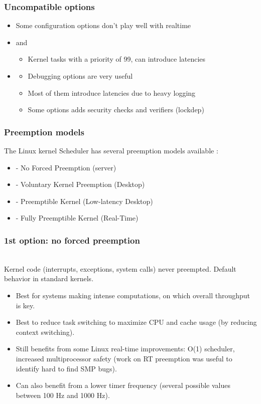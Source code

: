 \begin{frame}
  \frametitle{Uncompatible options}
	\begin{itemize}
		\item Some configuration options don't play well with realtime
		\item {} and 
			\begin{itemize}
				\item Kernel tasks with a priority of 99, can introduce latencies
			\end{itemize}
		\item {}
			\begin{itemize}
				\item Debugging options are very useful
				\item Most of them introduce latencies due to heavy logging
				\item Some options adds security checks and verifiers (lockdep)
			\end{itemize}
	\end{itemize}
\end{frame}

\begin{frame}
  \frametitle{Preemption models}
  The Linux kernel Scheduler has several preemption models available :
	\begin{itemize}
		\item {} - No Forced Preemption (server)
		\item {} - Voluntary Kernel Preemption (Desktop)
		\item {} - Preemptible Kernel (Low-latency Desktop)
		\item {} - Fully Preemptible Kernel (Real-Time)
	\end{itemize}
\end{frame}

\begin{frame}
  \frametitle{1st option: no forced preemption}
  \\
  Kernel code (interrupts, exceptions, system calls) never preempted.
  Default behavior in standard kernels.
  \begin{itemize}
  \item Best for systems making intense computations, on which overall
    throughput is key.
  \item Best to reduce task switching to maximize CPU and cache usage
    (by reducing context switching).
  \item Still benefits from some Linux real-time improvements: O(1)
    scheduler, increased multiprocessor safety (work on RT preemption
    was useful to identify hard to find SMP bugs).
  \item Can also benefit from a lower timer frequency (several possible
        values between 100 Hz and 1000 Hz).
  \end{itemize}
\end{frame}

